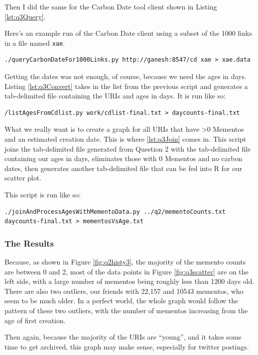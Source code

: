 \documentclass[letterpaper,11pt]{article}
\begin{document}
Then I did the same for the Carbon Date tool client shown in Listing \ref{lst:q3Query}.

Here's an example run of the Carbon Date client using a subset of the 1000 links in a file named \verb+xae+.
\begin{lstlisting}[frame=single]
./queryCarbonDateFor1000Links.py http://ganesh:8547/cd xae > xae.data
\end{lstlisting}

Getting the dates was not enough, of course, because we need the ages in days.  Listing \ref{lst:q3Convert} takes in the list from the previous script and generates a tab-delimited file containing the URIs and ages in days.  It is run like so:
\begin{lstlisting}[frame=single]
/listAgesFromCdlist.py work/cdlist-final.txt > daycounts-final.txt
\end{lstlisting}

What we really want is to create a graph for all URIs that have \textgreater 0 Mementos and an estimated creation date.  This is where \ref{lst:q3Join} comes in.  This script joins the tab-delimited file generated from Question 2 with the tab-delimited file containing our ages in days, eliminates those with 0 Mementos and no carbon dates, then generates another tab-delimited file that can be fed into R for our scatter plot.

This script is run like so:
\begin{lstlisting}[frame=single]
./joinAndProcessAgesWithMementoData.py ../q2/mementoCounts.txt daycounts-final.txt > mementosVsAge.txt
\end{lstlisting}

\subsubsection*{The Results}

Because, as shown in Figure \ref{fig:q2histy3}, the majority of the memento counts are between 0 and 2, most of the data points in Figure \ref{fig:q3scatter} are on the left side, with a large number of mementos being roughly less than 1200 days old.  There are also two outliers, our friends with 22,157 and 10543 mementos, who seem to be much older.  In a perfect world, the whole graph would follow the pattern of these two outliers, with the number of mementos increasing from the age of first creation.

Then again, because the majority of the URIs are ``young'', and it takes some time to get archived, this graph may make sense, especially for twitter postings.
\end{document}
